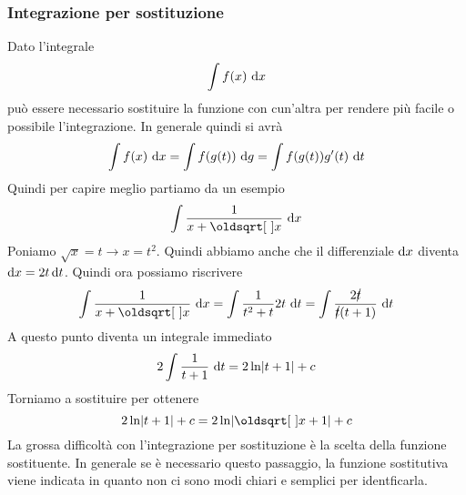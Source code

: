 \subsubsection{Integrazione per sostituzione}
Dato l'integrale
\begin{equation*}
  \int f(x)\,\mathop{}\!\mathrm{d} x
\end{equation*}
può essere necessario sostituire la funzione con cun'altra per rendere più facile o possibile 
l'integrazione. In generale quindi si avrà
\begin{equation*}
  \int f(x)\,\mathop{}\!\mathrm{d} x = \int f(g(t))\,\mathop{}\!\mathrm{d} g = \int f(g(t))g'(t)\,\mathop{}\!\mathrm{d} t
\end{equation*}
Quindi per capire meglio partiamo da un esempio
\begin{equation*}
  \int \frac{1}{x+\sqrt{x}}\,\dif x
\end{equation*}
Poniamo $\sqrt{x}=t \rightarrow x = t^2$. Quindi abbiamo anche che il differenziale $\mathop{}\!\mathrm{d} x$ 
diventa $\mathop{}\!\mathrm{d} x = 2t\mathop{}\!\mathrm{d} t$. Quindi ora possiamo riscrivere
\begin{equation*}
  \int \frac{1}{x+\sqrt{x}}\,\dif x = \int \frac{1}{t^2+t}2t\,\dif t = 
  \int\frac{2\cancel{t}}{\cancel{t}(t+1)}\,\dif t
\end{equation*}
A questo punto diventa un integrale immediato
\begin{equation*}
  2\int \frac{1}{t+1}\,\mathop{}\!\mathrm{d} t = 2\ln\lvert t+1\rvert+c
\end{equation*}
Torniamo a sostituire per ottenere
\begin{equation*}
  2\ln\abs{t+1}+c = 2\ln\abs{\sqrt{x}+1}+c
\end{equation*}
La grossa difficoltà con l'integrazione per sostituzione è la scelta della funzione sostituente.
In generale se è necessario questo passaggio, la funzione sostitutiva viene indicata in quanto non
ci sono modi chiari e semplici per identficarla.

